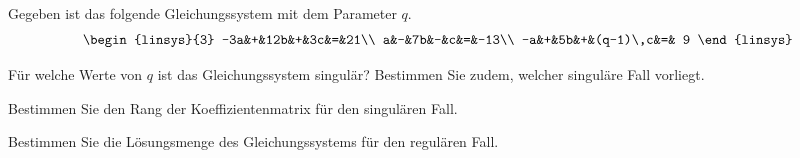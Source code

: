 Gegeben ist das folgende Gleichungssystem mit dem Parameter $q$.
\[
\begin{linsys}{3}
-3a&+&12b&+&3c&=&21\\
a&-&7b&-&c&=&-13\\
-a&+&5b&+&(q-1)\,c&=& 9
\end{linsys}
\]
\begin{teilaufgaben}
\item Für welche Werte von $q$ ist das Gleichungssystem singulär? 
Bestimmen Sie zudem, welcher singuläre Fall vorliegt.
\item Bestimmen Sie den Rang der Koeffizientenmatrix für den singulären Fall.
\item Bestimmen Sie die Lösungsmenge des Gleichungssystems für den regulären Fall.
\end{teilaufgaben}


